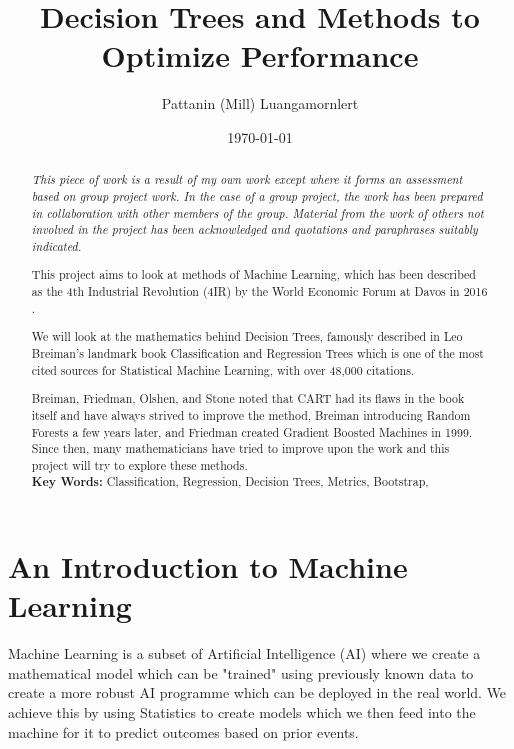 \documentclass[11pt,a4paper]{report}
\title{Decision Trees and Methods to Optimize Performance}
\author{Pattanin (Mill) Luangamornlert}
\date{\today}
\begin{document}
\maketitle

\begin{abstract}
    \emph{This piece of work is a result of my own work except where it forms an assessment based on group project work. In the case of a group project, the work has been prepared in collaboration with other members of the group. Material from the work of others not involved in the project has been acknowledged and quotations and paraphrases suitably indicated.}
    \bigskip
    
    This project aims to look at methods of Machine Learning, which has been described as the 4th Industrial Revolution (4IR) by the World Economic Forum at Davos in 2016 \cite{Schwab}.
    
    We will look at the mathematics behind Decision Trees, famously described in Leo Breiman's landmark book Classification and Regression Trees \cite{BreimanDT} which is one of the most cited sources for Statistical Machine Learning, with over 48,000 citations.
    
    Breiman, Friedman, Olshen, and Stone noted that CART had its flaws in the book itself and have always strived to improve the method, Breiman introducing Random Forests a few years later, and Friedman created Gradient Boosted Machines in 1999. Since then, many mathematicians have tried to improve upon the work and this project will try to explore these methods.
    \bigskip\\
    \textbf{Key Words:} Classification, Regression, Decision Trees, Metrics, Bootstrap,
    
    
    
\end{abstract}

\tableofcontents

\chapter{An Introduction to Machine Learning}
Machine Learning is a subset of Artificial Intelligence (AI) where we create a mathematical model which can be "trained" using previously known data to create a more robust AI programme which can be deployed in the real world.
We achieve this by using Statistics to create models which we then feed into the machine for it to predict outcomes based on prior events.
\end{document}

